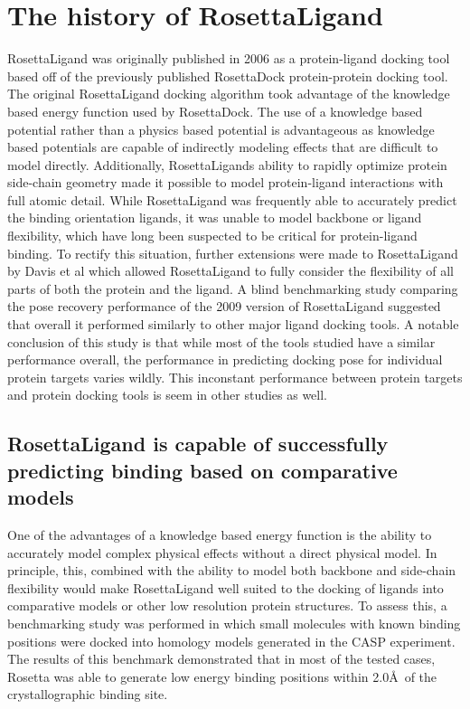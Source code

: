 \section{The history of RosettaLigand}
RosettaLigand was originally published in 2006\citep{Meiler:2006vj} as a protein-ligand docking tool based off of the previously published RosettaDock\citep{Gray:2003uk} protein-protein docking tool.
The original RosettaLigand docking algorithm took advantage of the knowledge based energy function used by RosettaDock.
The use of a knowledge based potential rather than a physics based potential is advantageous as knowledge based potentials are capable of indirectly modeling effects that are difficult to model directly. %
Additionally, RosettaLigands ability to rapidly optimize protein side-chain geometry\citep{Barth:2007cw} made it possible to model protein-ligand interactions with full atomic detail.
While RosettaLigand was frequently able to accurately predict the binding orientation ligands\citep{Meiler:2006vj}, it was unable to model backbone or ligand flexibility, which have long been suspected to be critical for protein-ligand binding\citep{Yang:2014dm,KOSHLAND:1958wa}.
To rectify this situation, further extensions were made to RosettaLigand by Davis et al\citep{Davis:2009bf} which allowed RosettaLigand to fully consider the flexibility of all parts of both the protein and the ligand.
A blind benchmarking study comparing the pose recovery performance of the 2009 version of RosettaLigand suggested that overall it performed similarly to other major ligand docking tools\citep{Davis:2009fx}.
A notable conclusion of this study is that while most of the tools studied have a similar performance overall, the performance in predicting docking pose for individual protein targets varies wildly.
This inconstant performance between protein targets and protein docking tools is seem in other studies as well. 

\subsection{RosettaLigand is capable of successfully predicting binding based on comparative models}
One of the advantages of a knowledge based energy function is the ability to accurately model complex physical effects without a direct physical model.
In principle, this, combined with the ability to model both backbone and side-chain flexibility would make RosettaLigand well suited to the docking of ligands into comparative models or other low resolution protein structures. 
To assess this, a benchmarking study was performed in which small molecules with known binding positions were docked into homology models generated in the CASP experiment\citep{Kaufmann:2012ck}.
The results of this benchmark demonstrated that in most of the tested cases, Rosetta was able to generate low energy binding positions within 2.0\AA\ of the crystallographic binding site.

